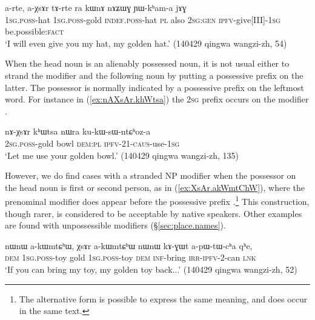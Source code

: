 \begin{exe}
\ex \label{ex:aXsAr.tArte}
\gll a-rte, a-χsɤr tɤ-rte ra kɯnɤ nɤʑɯɣ ɲɯ-kʰam-a jɤɣ \\
\textsc{1sg}.\textsc{poss}-hat \textsc{1sg}.\textsc{poss}-gold \textsc{indef}.\textsc{poss}-hat \textsc{pl} also \textsc{2sg}:\textsc{gen} \textsc{ipfv}-give[III]-\textsc{1sg} be.possible:\textsc{fact} \\
\glt `I will even give you my hat, my golden hat.' (140429 qingwa wangzi-zh, 54)
\end{exe}

When the head noun is an alienably possessed noun, it is not usual either to strand the modifier and the following noun by putting a possessive prefix on the latter. The possessor is normally indicated by a possessive prefix on the leftmost word. For instance in (\ref{ex:nAXsAr.khWtsa}) the \textsc{2sg} prefix  occurs on the modifier .

\begin{exe}
\ex \label{ex:nAXsAr.khWtsa}
\gll nɤ-χsɤr kʰɯtsa nɯra ku-kɯ-sɯ-ntɕʰoz-a \\
\textsc{2sg}.\textsc{poss}-gold bowl \textsc{dem}:\textsc{pl} \textsc{ipfv}-2\fl{}1-\textsc{caus}-use-\textsc{1sg} \\
\glt `Let me use your golden bowl.' (140429 qingwa wangzi-zh, 135)
\end{exe}

However, we do find cases with a stranded NP modifier when the possessor on the head noun is first or second person, as in (\ref{ex:XsAr.akWmtChW}), where the prenominal modifier  does appear before the possessive prefix .\footnote{The alternative form  is possible to express the same meaning, and does occur in the same text. } This construction, though rarer, is  considered to be acceptable by native speakers. Other examples are found with unpossessible modifiers (§\ref{sec:place.names}).

\begin{exe}
\ex \label{ex:XsAr.akWmtChW}
\gll  nɯnɯ a-kɯmtɕʰɯ, χsɤr a-kɯmtɕʰɯ nɯnɯ kɤ-ɣɯt a-pɯ-tɯ-cʰa qʰe,  \\
\textsc{dem} \textsc{1sg}.\textsc{poss}-toy gold \textsc{1sg}.\textsc{poss}-toy \textsc{dem} \textsc{inf}-bring \textsc{irr}-\textsc{ipfv}-2-can \textsc{lnk} \\
\glt `If you can bring my toy, my golden toy back...' (140429 qingwa wangzi-zh, 52)
\end{exe}

